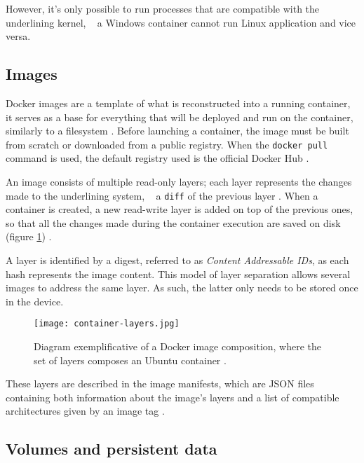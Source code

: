 However, it's only possible to run processes that are compatible with the underlining kernel, \ie~ a Windows container cannot run Linux application and vice versa.



\subsection{Images}
\label{sec::arch:images}
Docker images are a template of what is reconstructed into a running container, it serves as a base for everything that will be deployed and run on the container, similarly to a filesystem \cite{Kane2018-fn}. Before launching a container, the image must be built from scratch or downloaded from a public registry. When the \texttt{docker pull} command is used, the default registry used is the official Docker Hub \cite{docker-hub}.

An image consists of multiple read-only layers; each layer represents the changes made to the underlining system, \ie~ a \texttt{diff} of the previous layer \cite{images-layers}. When a container is created, a new read-write layer is added on top of the previous ones, so that all the changes made during the container execution are saved on disk (figure \ref{fig:docker-image}) \cite{fig-src:image-layers}.

A layer is identified by a digest, referred to as \textit{Content Addressable IDs}, as each hash represents the image content. This model of layer separation allows several images to address the same layer. As such, the latter only needs to be stored once in the device.

\begin{figure}[!htb]
    \centering
    \texttt{[image: container-layers.jpg]}
    \caption{Diagram exemplificative of a Docker image composition, where the set of layers composes an Ubuntu container \cite{fig-src:image-layers}.}
    \label{fig:docker-image}
\end{figure}

These layers are described in the image manifests, which are \acs{JSON} files containing both information about the image's layers and a list of compatible architectures given by an image tag \cite{image-manifest}.





\subsection{Volumes and persistent data}
\label{sec::arch:volumes}

